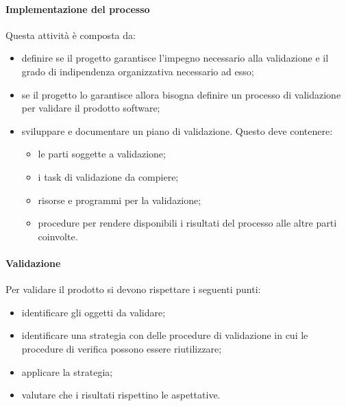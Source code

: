 	\paragraph{Implementazione del processo}
	Questa attività è composta da:
	\begin{itemize}
	\item definire se il progetto garantisce l'impegno necessario alla validazione e il grado di indipendenza organizzativa necessario ad esso;
	\item  se il progetto lo garantisce allora bisogna definire un processo di validazione per validare il prodotto software;
	\item sviluppare e documentare un piano di validazione. Questo deve contenere:
	\begin{itemize}
	\item le parti soggette a validazione;
	\item i task di validazione da compiere;
	\item risorse e programmi per la validazione;
	\item procedure per rendere disponibili i risultati del processo alle altre parti coinvolte.
	\end{itemize}
	\end{itemize}
	\paragraph{Validazione}
	Per validare il prodotto si devono rispettare i seguenti punti:
	\begin{itemize}
		\item identificare gli oggetti da validare;
		\item identificare una strategia con delle procedure di validazione in cui le procedure di verifica possono essere riutilizzare;
		\item applicare la strategia;
		\item valutare che i risultati rispettino le aspettative.
	\end{itemize}
